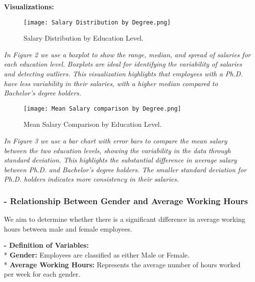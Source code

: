 \documentclass[12pt,a4paper]{article}
\begin{document}
\textbf{Visualizations:}

\begin{figure}[h!]
    \centering
    \texttt{[image: Salary Distribution by Degree.png]}
    \caption{Salary Distribution by Education Level.}
\end{figure}

\textit{In Figure 2 we use a boxplot to show the range, median, and spread of salaries for each education level. Boxplots are ideal for identifying the variability of salaries and detecting outliers. This visualization highlights that employees with a Ph.D. have less variability in their salaries, with a higher median compared to Bachelor's degree holders.}

\vspace{3em}





\begin{figure}[h!]
    \centering
    \texttt{[image: Mean Salary comparison by Degree.png]}
    \caption{Mean Salary Comparison by Education Level.}
\end{figure}

\vspace{1em}

\textit{In Figure 3 we use a bar chart with error bars to compare the mean salary between the two education levels, showing the variability in the data through standard deviation. This highlights the substantial difference in average salary between Ph.D. and Bachelor's degree holders. The smaller standard deviation for Ph.D. holders indicates more consistency in their salaries.}

\newpage



\subsubsection*{ - Relationship Between Gender and Average Working Hours}

We aim to determine whether there is a significant difference in average working hours between male and female employees.

\vspace{1em}

\noindent\textbf{ - Definition of Variables:} \\
* \textbf{Gender:} Employees are classified as either Male or Female. \\
* \textbf{Average Working Hours:} Represents the average number of hours worked per week for each gender.
\end{document}
